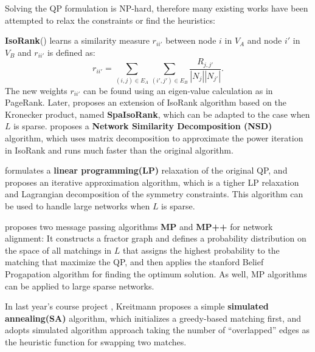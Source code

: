 \documentclass[11pt,letterpaper]{article}
\begin{document}
Solving the QP formulation is NP-hard, therefore many existing works have been attempted to relax the constraints or find the heuristics:

\textbf{IsoRank}(\cite{Singh2008}) learns a similarity measure $r_{ii'}$ between node $i$ in $V_A$ and node $i'$ in $V_B$ and $r_{ii'}$ is defined as:
   \begin{equation*}
           r_{ii'} = \sum_{(i, j) \in E_A}{\sum_{(i', j') \in E_B}{\frac{R_{j, j'}}{|N_j||N_{j'}|}}}.
   \end{equation*}
The new weights $r_{ii'}$ can be found using an eigen-value calculation as in PageRank. Later, \cite{Bayati2009a} proposes an extension of IsoRank algorithm based on the Kronecker product, named \textbf{SpaIsoRank}, which can be adapted to the case when $L$ is sparse. \cite{Kollias2011} proposes a \textbf{Network Similarity Decomposition (NSD)} algorithm, which uses matrix decomposition to approximate the power iteration in IsoRank and runs much faster than the original algorithm.

\cite{Klau2009} formulates a \textbf{linear programming(LP)} relaxation of the original QP, and proposes an iterative approximation algorithm, which is a tigher LP relaxation and Lagrangian decomposition of the symmetry constraints. This algorithm can be used to handle large networks when $L$ is sparse.

\cite{Bayati2009a} proposes two message passing algorithms \textbf{MP} and \textbf{MP++} for network alignment: It constructs a fractor graph and defines a probability distribution on the space of all matchings in $L$ that assigns the highest probability to the matching that maximize the QP, and then applies the stanford Belief Progapation algorithm for finding the optimum solution. As well, MP algorithms can be applied to large sparse networks.

In last year's course project \cite{Kreitmann2011}, Kreitmann proposes a simple \textbf{simulated annealing(SA)} algorithm, which initializes a greedy-based matching first, and adopts simulated algorithm approach taking the number of ``overlapped'' edges as the heuristic function for swapping two matches. 
\end{document}
